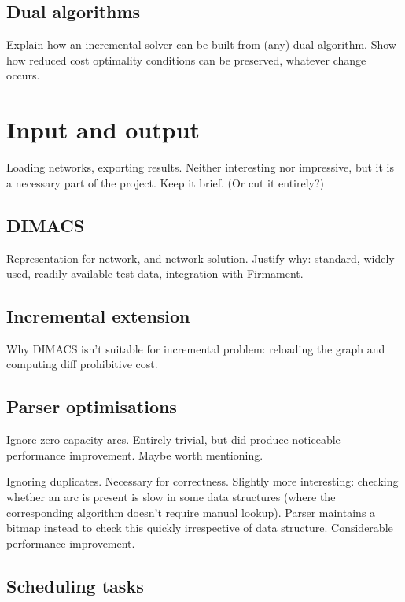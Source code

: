 \subsection{Dual algorithms}

Explain how an incremental solver can be built from (any) dual algorithm. Show how reduced cost optimality conditions can be preserved, whatever change occurs.

\section{Input and output}


Loading networks, exporting results. Neither interesting nor impressive, but it is a necessary part of the project. Keep it brief. (Or cut it entirely?)

\subsection{DIMACS}

Representation for network, and network solution. Justify why: standard, widely used, readily available test data, integration with Firmament. 

\subsection{Incremental extension}

Why DIMACS isn't suitable for incremental problem: reloading the graph and computing diff prohibitive cost. 

\subsection{Parser optimisations}

Ignore zero-capacity arcs. Entirely trivial, but did produce noticeable performance improvement. Maybe worth mentioning.

Ignoring duplicates. Necessary for correctness. Slightly more interesting: checking whether an arc is present is slow in some data structures (where the corresponding algorithm doesn't require manual lookup). Parser maintains a bitmap instead to check this quickly irrespective of data structure. Considerable performance improvement. 

\subsection{Scheduling tasks}

